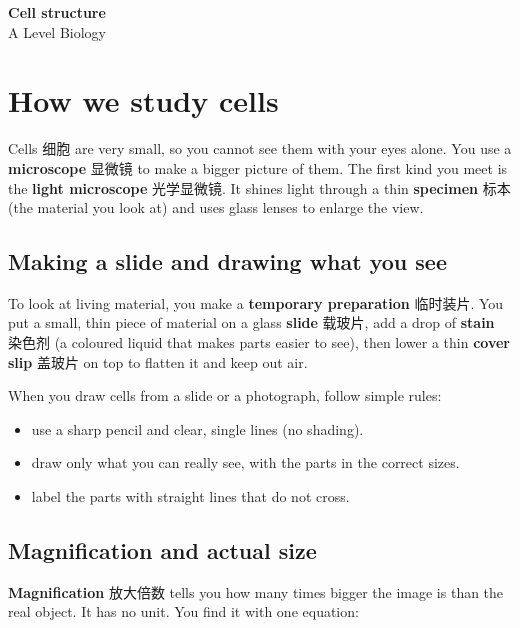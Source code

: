 \documentclass[11pt]{article}
\begin{document}
\begin{center}
  {\LARGE\bfseries Cell structure}\\[0.35em]
  {\large A Level Biology}
\end{center}
\vspace{0.6em}

\section*{How we study cells}

Cells 细胞 are very small, so you cannot see them with your eyes alone. You use a \textbf{microscope} 显微镜 to make a bigger picture of them. The first kind you meet is the \textbf{light microscope} 光学显微镜. It shines light through a thin \textbf{specimen} 标本 (the material you look at) and uses glass lenses to enlarge the view.

\subsection*{Making a slide and drawing what you see}

To look at living material, you make a \textbf{temporary preparation} 临时装片. You put a small, thin piece of material on a glass \textbf{slide} 载玻片, add a drop of \textbf{stain} 染色剂 (a coloured liquid that makes parts easier to see), then lower a thin \textbf{cover slip} 盖玻片 on top to flatten it and keep out air.

When you draw cells from a slide or a photograph, follow simple rules:

\begin{itemize}
\item use a sharp pencil and clear, single lines (no shading).

\item draw only what you can really see, with the parts in the correct sizes.

\item label the parts with straight lines that do not cross.

\end{itemize}

\subsection*{Magnification and actual size}

\textbf{Magnification} 放大倍数 tells you how many times bigger the image is than the real object. It has no unit. You find it with one equation:
\end{document}
